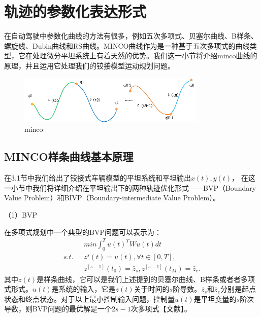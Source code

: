 \documentclass[master,academic]{ysuthesis} %
\begin{document}
	\section{轨迹的参数化表达形式}
	在自动驾驶中参数化曲线的方法有很多，例如五次多项式、贝塞尔曲线、B样条、螺旋线、Dubin曲线和RS曲线。MINCO曲线作为是一种基于五次多项式的曲线类型，它在处理微分平坦系统上有着天然的优势\cite{wang2022geometrically}。我们这一小节将介绍minco曲线的原理，并且运用它处理我们的铰接模型运动规划问题。
	\begin{figure}[!ht]
		\centering
		\includegraphics[width=0.8\textwidth]{minco.png}
		\caption{minco}
		\label{fig:minco}
	\end{figure}
		\subsection{MINCO样条曲线基本原理}
		在3.1节中我们给出了铰接式车辆模型的平坦系统和平坦输出$x(t),y(t)$， 在这一小节中我们将详细介绍在平坦输出下的两种轨迹优化形式——BVP（Boundary Value Problem）和BIVP（Boundary-intermediate Value Problem）\cite{lewis2012optimal,vinter2010optimal}。

		（1）BVP

		在多项式规划中一个典型的BVP问题可以表示为：
		\begin{equation}
			\begin{aligned}
				&min\int_0^T{u}(t) ^TWu(t) dt\\
				s.t. \ \ \ &z^s(t) =u(t) ,\forall t\in \left[ 0,T \right] ,\\
				&z^{\left[ s-1 \right]}( t_0 ) =\bar{z}_s,z^{\left[ s-1 \right]}( t_M ) =\bar{z}_e.
			\end{aligned}
		\end{equation}
		其中$z(t)$是样条曲线，它可以是我们上述提到的贝塞尔曲线、B样条或者者多项式形式。$u(t)$是系统的输入，它是$z(t)$关于时间的$s$阶导数。$\bar{z}_s$和$\bar{z}_e$分别是起点状态和终点状态。对于以上最小控制输入问题，控制量$u(t)$是平坦变量的$s$阶次导数，则BVP问题的最优解是一个$2s-1$次多项式【文献】。
\end{document}
